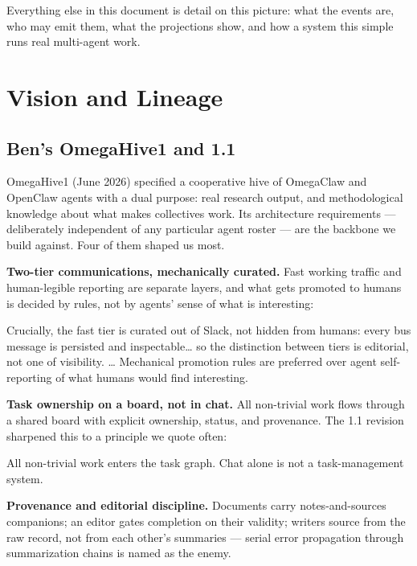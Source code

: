 Everything else in this document is detail on this picture: what the events are, who may emit them, what the projections show, and how a system this simple runs real multi-agent work.

\section{Vision and Lineage}

\subsection{Ben's OmegaHive1 and 1.1}

OmegaHive1 (June 2026) specified a cooperative hive of OmegaClaw and OpenClaw agents with a dual purpose: real research output, and methodological knowledge about what makes collectives work. Its architecture requirements --- deliberately independent of any particular agent roster --- are the backbone we build against. Four of them shaped us most.

\textbf{Two-tier communications, mechanically curated.} Fast working traffic and human-legible reporting are separate layers, and what gets promoted to humans is decided by rules, not by agents' sense of what is interesting:

\begin{benquote}
Crucially, the fast tier is curated out of Slack, not hidden from humans: every bus message is persisted and inspectable\ldots{} so the distinction between tiers is editorial, not one of visibility. \ldots{} Mechanical promotion rules are preferred over agent self-reporting of what humans would find interesting.
\end{benquote}

\textbf{Task ownership on a board, not in chat.} All non-trivial work flows through a shared board with explicit ownership, status, and provenance. The 1.1 revision sharpened this to a principle we quote often:

\begin{benquote}
All non-trivial work enters the task graph. Chat alone is not a task-management system.
\end{benquote}

\textbf{Provenance and editorial discipline.} Documents carry notes-and-sources companions; an editor gates completion on their validity; writers source from the raw record, not from each other's summaries --- serial error propagation through summarization chains is named as the enemy.

